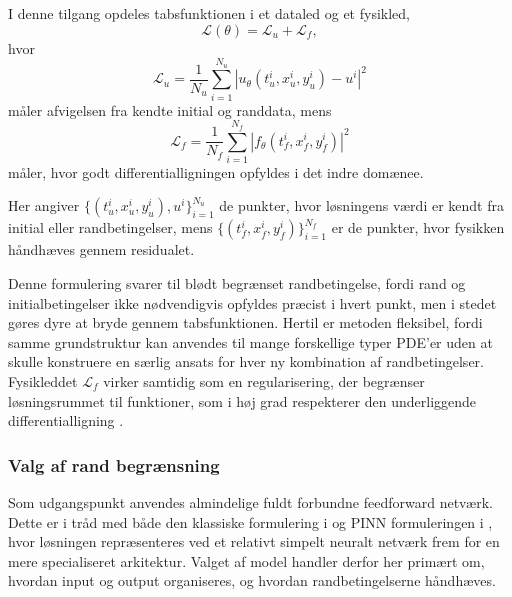 I denne tilgang opdeles tabsfunktionen i et dataled og et fysikled,
\begin{equation}
    \mathcal{L}(\theta) = \mathcal{L}_u + \mathcal{L}_f,
    \label{eq:pinn_soft_loss}
\end{equation}
hvor
\begin{equation}
    \mathcal{L}_u
    =
    \frac{1}{N_u}\sum_{i=1}^{N_u}
    \left|u_\theta(t_u^i,x_u^i,y_u^i)-u^i\right|^2
    \label{eq:pinn_soft_data}
\end{equation}
måler afvigelsen fra kendte initial og randdata, mens
\begin{equation}
    \mathcal{L}_f
    =
    \frac{1}{N_f}\sum_{i=1}^{N_f}
    \left|f_\theta(t_f^i,x_f^i,y_f^i)\right|^2
    \label{eq:pinn_soft_physics}
\end{equation}
måler, hvor godt differentialligningen opfyldes i det indre domænee. 

Her angiver $\{(t_u^i,x_u^i,y_u^i),u^i\}_{i=1}^{N_u}$ de punkter, hvor løsningens værdi er kendt fra initial eller randbetingelser, mens $\{(t_f^i,x_f^i,y_f^i)\}_{i=1}^{N_f}$ er de punkter, hvor fysikken håndhæves gennem residualet.

Denne formulering svarer til blødt begrænset randbetingelse, fordi rand og initialbetingelser ikke nødvendigvis opfyldes præcist i hvert punkt, men i stedet gøres dyre at bryde gennem tabsfunktionen.
Hertil er metoden fleksibel, fordi samme grundstruktur kan anvendes til mange forskellige typer PDE'er uden at skulle konstruere en særlig ansats for hver ny kombination af randbetingelser. Fysikleddet $\mathcal{L}_f$ virker samtidig som en regularisering, der begrænser løsningsrummet til funktioner, som i høj grad respekterer den underliggende differentialligning \cite{raissi2017pinn_part1}.



\subsubsection{Valg af rand begrænsning}\label{ch2_1_2}

Som udgangspunkt anvendes almindelige fuldt forbundne feedforward netværk. Dette er i tråd med både den klassiske formulering i \cite{lagaris1997ann_pde} og PINN formuleringen i \cite{raissi2017pinn_part1}, hvor løsningen repræsenteres ved et relativt simpelt neuralt netværk frem for en mere specialiseret arkitektur. Valget af model handler derfor her primært om, hvordan input og output organiseres, og hvordan randbetingelserne håndhæves.

